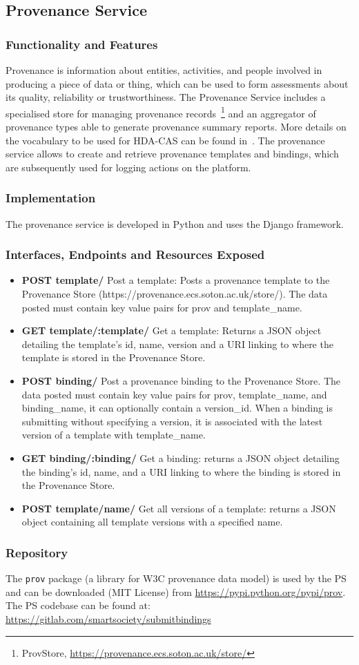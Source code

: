 \subsection{Provenance Service}
\subsubsection{Functionality and Features}
Provenance is information about entities, activities, and people involved in producing a piece of data or thing, which can be used to form assessments about its quality, reliability or trustworthiness. The Provenance Service includes a specialised store for managing provenance records~\footnote{ProvStore, \url{https://provenance.ecs.soton.ac.uk/store/}} and an aggregator of provenance types able to generate provenance summary reports. More details on the vocabulary to be used for HDA-CAS can be found in~\cite{D2.4}. The provenance service allows to create and retrieve provenance templates and bindings, which are subsequently used for logging actions on the platform. 

\subsubsection{Implementation}
The provenance service is developed in Python and uses the Django framework.

\subsubsection{Interfaces, Endpoints and Resources Exposed}
\begin{itemize}
\item {\bf POST template/} Post a template: Posts a provenance template to the Provenance Store (https://provenance.ecs.soton.ac.uk/store/). The data posted must contain key value pairs for prov and template\_name.
\item {\bf GET template/:template/} Get a template: Returns a JSON object detailing the template's id, name, version and a URI linking to where the template is stored in the Provenance Store.
\item {\bf POST binding/} Post a provenance binding to the Provenance Store. The data posted must contain key value pairs for prov, template\_name, and binding\_name, it can optionally contain a version\_id.  When a binding is submitting without specifying a version, it is associated with the latest version of a template with template\_name.
\item {\bf GET binding/:binding/} Get a binding: returns a JSON object detailing the binding's id, name, and a URI linking to where the binding is stored in the Provenance Store.
\item {\bf POST template/name/} Get all versions of a template: returns a JSON object containing all template versions with a specified name.
\end{itemize}

\subsubsection{Repository}
The {\tt prov} package (a library for W3C provenance data model) is used by the PS and can be downloaded (MIT License) from \url{https://pypi.python.org/pypi/prov}.
The PS codebase can be found at: \url{https://gitlab.com/smartsociety/submitbindings}
